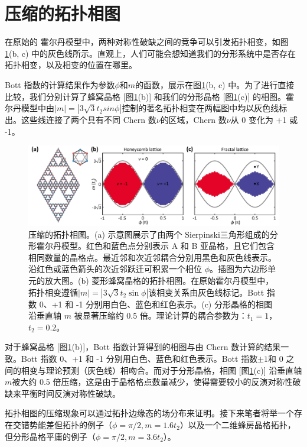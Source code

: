 \section{压缩的拓扑相图}
在原始的 霍尔丹模型中，两种对称性破缺之间的竞争可以引发拓扑相变，如图 \ref{fig:SqueezedPhase}(b, c) 中的灰色线所示。直观上，人们可能会想知道我们的分形系统中是否存在拓扑相变，以及相变的位置在哪里。

Bott 指数的计算结果作为参数$\phi$和$m$的函数，展示在图\ref{fig:SqueezedPhase}(b, c) 中。为了进行直接比较，我们分别计算了蜂窝晶格 [图\ref{fig:SqueezedPhase}(b)] 和我们的分形晶格 [图\ref{fig:SqueezedPhase}(c)] 的相图。霍尔丹模型中由$|m|=|3\sqrt{3}t_2sin\phi|$控制的著名拓扑相变在两幅图中均以灰色线标出。这些线连接了两个具有不同 Chern 数$\nu$的区域，Chern 数$\nu$从 0 变化为 +1 或 -1。

\begin{figure}[htbp]
    \centering
    \includegraphics[width=1\linewidth]{figure/FracHaldTheo/SqueezedPhase.PNG}
    \caption{压缩的拓扑相图。(a) 示意图展示了由两个 Sierpinski三角形组成的分形霍尔丹模型。红色和蓝色点分别表示 A 和 B 亚晶格，且它们包含相同数量的晶格点。最近邻和次近邻耦合分别用黑色和灰色线表示。沿红色或蓝色箭头的次近邻跃迁可积累一个相位 $\phi$。插图为六边形单元的放大图。(b) 菱形蜂窝晶格的拓扑相图。在原始霍尔丹模型中，拓扑相变遵循$|m| = |3\sqrt{3} t_2 \sin \phi|$该相变关系由灰色线标记。Bott 指数 0、+1 和 -1 分别用白色、蓝色和红色表示。(c) 分形晶格的相图沿垂直轴 $m$ 被显著压缩约 0.5 倍。理论计算的耦合参数为：$t_1 = 1$，$t_2 = 0.2$。}
    \label{fig:SqueezedPhase}
\end{figure}

对于蜂窝晶格 [图\ref{fig:SqueezedPhase}(b)]，Bott 指数计算得到的相图与由 Chern 数计算的结果一致。Bott 指数 0、+1 和 -1 分别用白色、蓝色和红色表示。Bott 指数$\pm1$和 0 之间的相变与理论预测（灰色线）相吻合。而对于分形晶格，相图 [图\ref{fig:SqueezedPhase}(c)] 沿垂直轴$m$被大约 0.5 倍压缩，这是由于晶格格点数量减少，使得需要较小的反演对称性破缺来平衡时间反演对称性破缺。

拓扑相图的压缩现象可以通过拓扑边缘态的场分布来证明。接下来笔者将举一个存在交错势能差但拓扑的例子（$\phi = \pi/2, m = 1.6t_2$）以及一个二维蜂房晶格拓扑，但分形晶格平庸的例子（$\phi = \pi/2, m = 3.6t_2$）。

